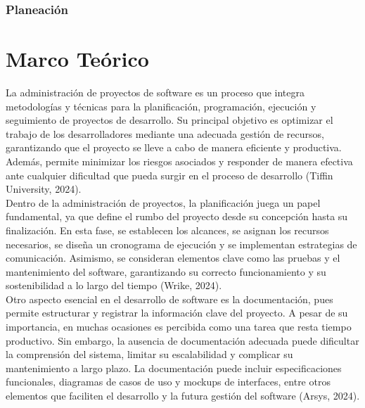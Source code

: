 \documentclass[12pt,letterpaper,spanish, xcolor=table]{report}
\begin{document}
	
	
\subsection{Planeación}



	
\chapter{Marco Teórico}
\newpage

La administración de proyectos de software es un proceso que integra metodologías y técnicas para la planificación, programación, ejecución y seguimiento de proyectos de desarrollo. Su principal objetivo es optimizar el trabajo de los desarrolladores mediante una adecuada gestión de recursos, garantizando que el proyecto se lleve a cabo de manera eficiente y productiva. Además, permite minimizar los riesgos asociados y responder de manera efectiva ante cualquier dificultad que pueda surgir en el proceso de desarrollo (Tiffin University, 2024). \\

Dentro de la administración de proyectos, la planificación juega un papel fundamental, ya que define el rumbo del proyecto desde su concepción hasta su finalización. En esta fase, se establecen los alcances, se asignan los recursos necesarios, se diseña un cronograma de ejecución y se implementan estrategias de comunicación. Asimismo, se consideran elementos clave como las pruebas y el mantenimiento del software, garantizando su correcto funcionamiento y su sostenibilidad a lo largo del tiempo (Wrike, 2024).\\

Otro aspecto esencial en el desarrollo de software es la documentación, pues permite estructurar y registrar la información clave del proyecto. A pesar de su importancia, en muchas ocasiones es percibida como una tarea que resta tiempo productivo. Sin embargo, la ausencia de documentación adecuada puede dificultar la comprensión del sistema, limitar su escalabilidad y complicar su mantenimiento a largo plazo. La documentación puede incluir especificaciones funcionales, diagramas de casos de uso y mockups de interfaces, entre otros elementos que faciliten el desarrollo y la futura gestión del software (Arsys, 2024).\\
\end{document}

